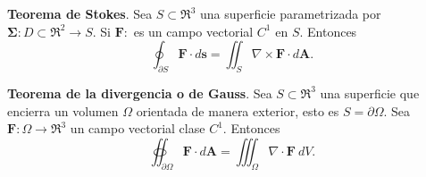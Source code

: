\begin{theorem}
\textbf{Teorema de Stokes}. Sea $S\subset\Re^3$ una superficie parametrizada por $\boldsymbol{\Sigma}:D\subset\Re^2\to S$. Si $\mathbf{F}:$ es un campo vectorial $C^1$ en $S$. Entonces
\[
    \oint_{\partial S}\mathbf{F}\cdot d\mathbf{s}=\iint_S\nabla\times\mathbf{F}\cdot d\mathbf{A}.
\]
\end{theorem}

\begin{theorem}
\textbf{Teorema de la divergencia o de Gauss}. Sea $S\subset\Re^3$ una superficie que encierra un volumen $\Omega$ orientada de manera exterior, esto es $S=\partial \Omega$. Sea $\mathbf{F}:\Omega\to\Re^3$ un campo vectorial clase $C^1$. Entonces
\[
    \oiint_{\partial \Omega}\mathbf{F}\cdot d\mathbf{A}=\iiint_{\Omega}\nabla\cdot\mathbf{F}\:dV.
\]
\end{theorem}